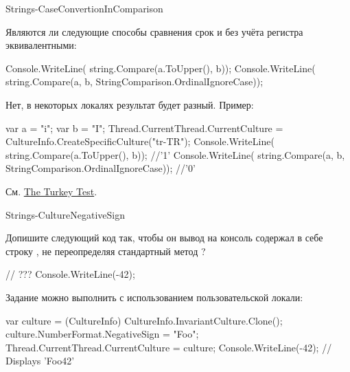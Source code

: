 \begin{defproblem}{Strings-CaseConvertionInComparison}
\begin{onlyproblem}
  Являются ли следующие способы сравнения срок  и  без учёта регистра эквивалентными:
  \begin{source}
  Console.WriteLine(
    string.Compare(a.ToUpper(), b));
  Console.WriteLine(
    string.Compare(a, b, StringComparison.OrdinalIgnoreCase));
  \end{source}
\end{onlyproblem}
\begin{onlysolution}
  Нет, в некоторых локалях результат будет разный. Пример:
  \begin{source}
  var a = "i";
  var b = "I";
  Thread.CurrentThread.CurrentCulture = 
    CultureInfo.CreateSpecificCulture("tr-TR");
  Console.WriteLine(
    string.Compare(a.ToUpper(), b)); //'1'
  Console.WriteLine(
    string.Compare(a, b, StringComparison.OrdinalIgnoreCase)); //'0'
  \end{source}
  См. \href{http://www.moserware.com/2008/02/does-your-code-pass-turkey-test.html}{The Turkey Test}.
\end{onlysolution}
\end{defproblem}
\begin{defproblem}{Strings-CultureNegativeSign}
\begin{onlyproblem}
  Допишите следующий код так, чтобы он вывод на консоль содержал в себе строку , не переопределяя стандартный метод ?
  \begin{source}
  // ???
  Console.WriteLine(-42);
  \end{source}
\end{onlyproblem}
\begin{onlysolution}
  Задание можно выполнить с использованием пользовательской локали:
  \begin{source}
  var culture = (CultureInfo) CultureInfo.InvariantCulture.Clone();
  culture.NumberFormat.NegativeSign = "Foo";
  Thread.CurrentThread.CurrentCulture = culture;
  Console.WriteLine(-42); // Displays 'Foo42'
  \end{source}
\end{onlysolution}
\end{defproblem}
